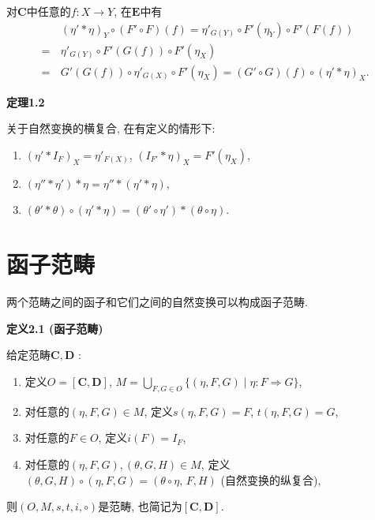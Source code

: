 \documentclass[UTF8]{ctexart}
\begin{document}
对$\mathbf{C}$中任意的$f:X\to Y$, 在$\mathbf{E}$中有
\vspace{3pt}
\begin{equation*}\begin{aligned}
    &\,(\eta'\ast\eta)_Y\circ(F'\circ F)(f)
    =\eta'_{G(Y)}\circ F'(\eta_Y)\circ F'(F(f))\\[-2pt]
    =&\,\eta'_{G(Y)}\circ F'(G(f))\circ F'(\eta_X)\\[-2pt]
    =&\,G'(G(f))\circ\eta'_{G(X)}\circ F'(\eta_X)=
    (G'\circ G)(f)\circ(\eta'\ast\eta)_X.
\end{aligned}\tag*{\qedsymbol}\end{equation*}

\vspace{10pt}

\hypertarget{sec:定理1.2}{}
\noindent\textbf{定理1.2}

关于自然变换的横复合, 在有定义的情形下:
\begin{enumerate}
    \item $(\eta'\ast I_F)_X=\eta'_{F(X)}$, $(I_{F'}\ast\eta)_X=F'(\eta_X)$,
    \item $(\eta''\ast\eta')\ast\eta=\eta''\ast(\eta'\ast\eta)$,
    \item $(\theta'\ast\theta)\circ(\eta'\ast\eta)
=(\theta'\circ\eta')\ast(\theta\circ\eta)$.
\end{enumerate}





\newpage

\section{函子范畴}

两个范畴之间的函子和它们之间的自然变换可以构成函子范畴.

\vspace{10pt}

\hypertarget{sec:定义2.1}{}
\noindent\textbf{定义2.1 (函子范畴)}

给定范畴$\mathbf{C},\mathbf{D}$ :
\begin{enumerate}
    \item 定义$O=[\mathbf{C},\mathbf{D}]$,
    $\displaystyle M=\bigcup_{F,G\in O}\{(\eta,F,G)\mid \eta:F\Rightarrow G\}$,
    \vspace{3pt}
    \item 对任意的$(\eta,F,G)\in M$, 定义$s(\eta,F,G)=F$, $t(\eta,F,G)=G$,
    \item 对任意的$F\in O$, 定义$i(F)=I_F$,
    \item 对任意的$(\eta,F,G),(\theta,G,H)\in M$,
    定义$(\theta,G,H)\circ(\eta,F,G)=(\theta\circ\eta,\,F,H)$ (自然变换的纵复合),
\end{enumerate}
则$(O,M,s,t,i,\circ)$是范畴, 也简记为$[\mathbf{C},\mathbf{D}]$.
\end{document}
